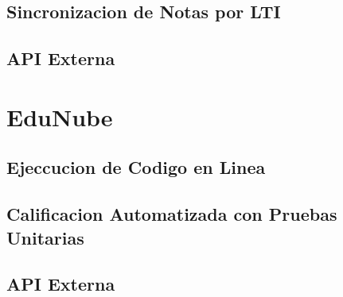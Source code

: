 
\subsection{Sincronizacion de Notas por LTI}

\subsection{API Externa}

\section{EduNube}

\subsection{Ejeccucion de Codigo en Linea}

\subsection{Calificacion Automatizada con Pruebas Unitarias}

\subsection{API Externa}
